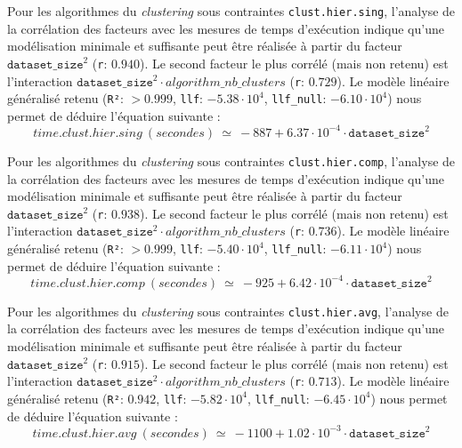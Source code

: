 			Pour les algorithmes du \textit{clustering} sous contraintes \texttt{clust.hier.sing}, l'analyse de la corrélation des facteurs avec les mesures de temps d'exécution indique qu'une modélisation minimale et suffisante peut être réalisée à partir du facteur $\texttt{dataset\_size}^{2}$ (\texttt{r}: $0.940$).
			Le second facteur le plus corrélé (mais non retenu) est l'interaction $\texttt{dataset\_size}^{2} \cdot algorithm\_nb\_clusters$ (\texttt{r}: $0.729$).
			Le modèle linéaire généralisé retenu (\texttt{R²}: $> 0.999$, \texttt{llf}: $-5.38 \cdot 10^{4}$, \texttt{llf\_null}: $-6.10 \cdot 10^{4}$) nous permet de déduire l'équation suivante :
			\begin{equation}
				time.clust.hier.sing~(secondes)~
				\simeq~-887 + 6.37 \cdot 10^{-4} \cdot \texttt{dataset\_size}^{2}
			\end{equation}
			
			Pour les algorithmes du \textit{clustering} sous contraintes \texttt{clust.hier.comp}, l'analyse de la corrélation des facteurs avec les mesures de temps d'exécution indique qu'une modélisation minimale et suffisante peut être réalisée à partir du facteur $\texttt{dataset\_size}^{2}$ (\texttt{r}: $0.938$).
			Le second facteur le plus corrélé (mais non retenu) est l'interaction $\texttt{dataset\_size}^{2} \cdot algorithm\_nb\_clusters$ (\texttt{r}: $0.736$).
			Le modèle linéaire généralisé retenu (\texttt{R²}: $> 0.999$, \texttt{llf}: $-5.40 \cdot 10^{4}$, \texttt{llf\_null}: $-6.11 \cdot 10^{4}$) nous permet de déduire l'équation suivante :
			\begin{equation}
				time.clust.hier.comp~(secondes)~
				\simeq~-925 + 6.42 \cdot 10^{-4} \cdot \texttt{dataset\_size}^{2}
			\end{equation}

			Pour les algorithmes du \textit{clustering} sous contraintes \texttt{clust.hier.avg}, l'analyse de la corrélation des facteurs avec les mesures de temps d'exécution indique qu'une modélisation minimale et suffisante peut être réalisée à partir du facteur $\texttt{dataset\_size}^{2}$ (\texttt{r}: $0.915$).
			Le second facteur le plus corrélé (mais non retenu) est l'interaction $\texttt{dataset\_size}^{2} \cdot algorithm\_nb\_clusters$ (\texttt{r}: $0.713$).
			Le modèle linéaire généralisé retenu (\texttt{R²}: $0.942$, \texttt{llf}: $-5.82 \cdot 10^{4}$, \texttt{llf\_null}: $-6.45 \cdot 10^{4}$) nous permet de déduire l'équation suivante :
			\begin{equation}
				time.clust.hier.avg~(secondes)~
				\simeq~-1100 + 1.02 \cdot 10^{-3} \cdot \texttt{dataset\_size}^{2}
			\end{equation}

